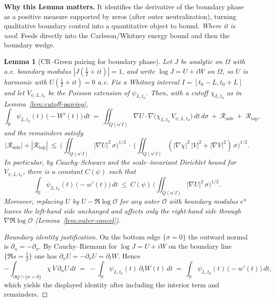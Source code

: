 \documentclass[11pt]{article}
\newtheorem{lemma}{Lemma}[section]
\theoremstyle{definition}
\theoremstyle{remark}
\newcommand{\R}{\mathbb{R}}
\begin{document}
\vspace{1.0cm}
\noindent\textbf{Why this Lemma matters.} It identifies the derivative of the boundary phase as a positive measure supported by zeros (after outer neutralization), turning qualitative boundary control into a quantitative object to bound.
\noindent\textit{Where it is used.} Feeds directly into the Carleson/Whitney energy bound and then the boundary wedge.
\begin{lemma}[CR–Green pairing for boundary phase]
\label{lem:CR-green-phase}
Let $J$ be analytic on $\Omega$ with a.e. boundary modulus $|J(\tfrac12+it)|=1$, and write $\log J=U+iW$ on $\Omega$, so $U$ is harmonic with $U(\tfrac12+it)=0$ a.e. Fix a Whitney interval $I=[t_0-L,t_0+L]$ and let $V_{\psi,L,t_0}$ be the Poisson extension of $\psi_{L,t_0}$. Then, with a cutoff $\chi_{L,t_0}$ as in Lemma~\ref{lem:cutoff-pairing},
\[
  \int_{\R} \psi_{L,t_0}(t)\,\big(-W'(t)\big)\,dt\ =\ \iint_{Q(\alpha'I)} \nabla U\cdot \nabla\big(\chi_{L,t_0}\,V_{\psi,L,t_0}\big)\,dt\,d\sigma\ +\ \mathcal R_{\mathrm{side}}\ +\ \mathcal R_{\mathrm{top}},
\]
and the remainders satisfy
\[
  |\mathcal R_{\mathrm{side}}|+|\mathcal R_{\mathrm{top}}|\ \lesssim\ \Big(\iint_{Q(\alpha'I)} |\nabla U|^2\,\sigma\Big)^{1/2}\ \cdot\ \Big(\iint_{Q(\alpha'I)} (|\nabla\chi|^2\,|V|^2+|\nabla V|^2)\,\sigma\Big)^{1/2}.
\]
In particular, by Cauchy–Schwarz and the scale–invariant Dirichlet bound for $V_{\psi,L,t_0}$, there is a constant $C(\psi)$ such that
\[
  \int_{\R} \psi_{L,t_0}(t)\,\big(-w'(t)\big)\,dt\ \le\ C(\psi)\,\Big(\iint_{Q(\alpha'I)} |\nabla U|^2\,\sigma\Big)^{1/2}.
\]
Moreover, replacing $U$ by $U-\Re\log\mathcal O$ for any outer $\mathcal O$ with boundary modulus $e^{u}$ leaves the left-hand side unchanged and affects only the right-hand side through $\nabla\Re\log\mathcal O$ (Lemma~\ref{lem:outer-cancel}).
\end{lemma}
\begin{proof}[Boundary identity justification]
On the bottom edge $\{\sigma=0\}$ the outward normal is $\partial_n=-\partial_\sigma$. By Cauchy–Riemann for $\log J=U+iW$ on the boundary line $\{\Re s=\tfrac12\}$ one has $\partial_n U=-\partial_\sigma U=\partial_t W$. Hence
\[
-\int_{\partial Q\cap\{\sigma=0\}} \chi\,V\,\partial_n U\,dt\ =\ -\int_{\R} \psi_{L,t_0}(t)\,\partial_t W(t)\,dt\ =\ \int_{\R} \psi_{L,t_0}(t)\,\big(-w'(t)\big)\,dt,
\]
which yields the displayed identity after including the interior term and remainders.
\end{proof}
\end{document}
